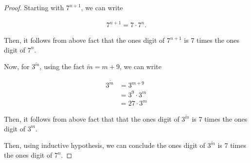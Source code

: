 \documentclass[12pt]{article}
\begin{document}
\begin{itemize}
\begin{proof}
    Starting with $7^{n+1}$, we can write

    \begin{align}
        7^{n+1} = 7 \cdot 7^n.
    \end{align}

    \bigskip

    Then, it follows from above fact that the ones digit of $7^{n+1}$
    is 7 times the ones digit of $7^n$.

    \bigskip

    Now, for $3^{\tilde{m}}$, using the fact $\tilde{m} = m + 9$, we
    can write

    \begin{align}
        3^{\tilde{m}} &= 3^{m+9}\\
        &= 3^9 \cdot 3^m\\
        &= 27 \cdot 3^m
    \end{align}

    \bigskip

    Then, it follows from above fact that that the ones digit of $3^{\tilde{m}}$
    is 7 times the ones digit of $3^m$.

    \bigskip

    Then, using inductive hypothesis, we can conclude the ones digit of $3^{\tilde{m}}$
    is 7 times the ones digit of $7^n$.

    \end{proof}













\end{itemize}
\end{document}
